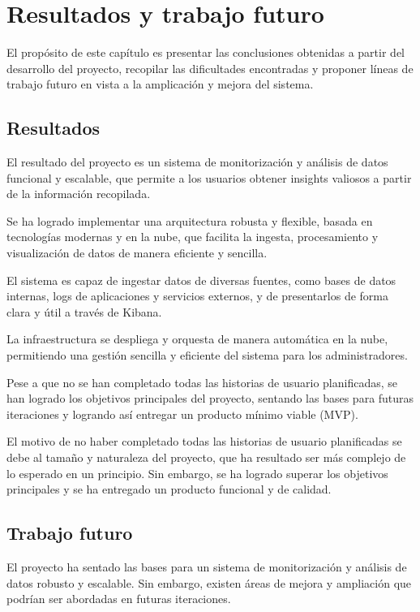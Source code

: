 \chapter{Resultados y trabajo futuro}
El propósito de este capítulo es presentar las conclusiones obtenidas a partir
del desarrollo del proyecto, recopilar las dificultades encontradas y proponer
líneas de trabajo futuro en vista a la amplicación y mejora del sistema.

\section{Resultados}
El resultado del proyecto es un sistema de monitorización y análisis de datos
funcional y escalable, que permite a los usuarios obtener insights valiosos a
partir de la información recopilada.

Se ha logrado implementar una arquitectura robusta y flexible, basada en
tecnologías modernas y en la nube, que facilita la ingesta, procesamiento y
visualización de datos de manera eficiente y sencilla.

El sistema es capaz de ingestar datos de diversas fuentes, como bases de datos
internas, logs de aplicaciones y servicios externos, y de presentarlos de forma
clara y útil a través de Kibana.

La infraestructura se despliega y orquesta de manera automática en la nube,
permitiendo una gestión sencilla y eficiente del sistema para los
administradores.

Pese a que no se han completado todas las historias de usuario planificadas,
se han logrado los objetivos principales del proyecto, sentando las bases para
futuras iteraciones y logrando así entregar un producto mínimo viable (MVP).

El motivo de no haber completado todas las historias de usuario planificadas
se debe al tamaño y naturaleza del proyecto, que ha resultado ser más complejo
de lo esperado en un principio. Sin embargo, se ha logrado superar los objetivos
principales y se ha entregado un producto funcional y de calidad.


\newpage{}
\section{Trabajo futuro}
El proyecto ha sentado las bases para un sistema de monitorización y análisis de
datos robusto y escalable. Sin embargo, existen áreas de mejora y ampliación que
podrían ser abordadas en futuras iteraciones.


